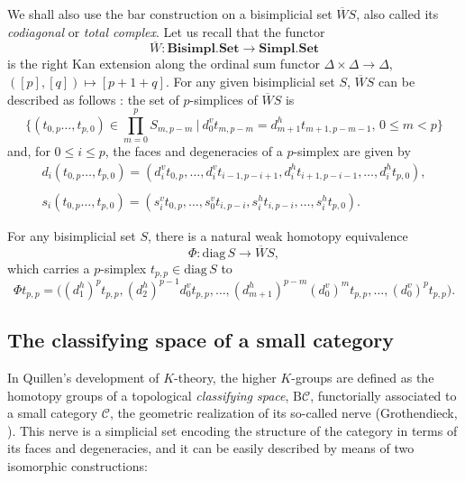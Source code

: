 \documentclass[]{amsart}
\begin{document}
We shall also use the bar construction on a bisimplicial set $\overline{W}S$, also called its {\em
codiagonal} or {\em total complex}. Let us recall that the functor
$$
\overline{W}: {\ensuremath{\mathbf{Bisimpl.Set}}} \to {\ensuremath{\mathbf{Simpl.Set}}}
$$
is  the right Kan extension along the ordinal sum functor ${\ensuremath{\Delta}}\times {\ensuremath{\Delta}} \to{\ensuremath{\Delta}}$,
$([p],[q])\mapsto [p+1+q]$. For any given bisimplicial set $S$, $\overline{W}S$ can be described as
follows \cite[\S III]{artin-mazur}: the set of $p$-simplices of $\overline{W}S$ is
$$
\Big\{(t_{0,p} \dots,t_{p,0})\in
\prod_{m=0}^{p}S_{m,p-m}~|~d^v_0t_{m,p-m}=d^h_{m+1}t_{m+1,p-m-1},\, 0\leq m< p\Big\}$$ and, for
$0\leq i\leq p$, the faces and degeneracies of a $p$-simplex are given by
$$
\begin{array}{l}d_i(t_{0,p}
\dots,t_{p,0})=(d_i^vt_{0,p},\dots,d_i^vt_{i-1,p-i+1},d_i^ht_{i+1,p-i-1},\dots,d_i^ht_{p,0}),
\\[-4pt]~\\
s_i(t_{0,p} \dots,t_{p,0})=(s_i^vt_{0,p},\dots,s_0^vt_{i,p-i},s_i^ht_{i,p-i},\dots,s_i^ht_{p,0}).
\end{array}
$$

For any bisimplicial set $S$, there is a natural weak homotopy equivalence \cite{cegarra1,cegarra2}
\begin{equation}\label{Phi} \Phi:{\ensuremath{\mathrm{diag}}}\,S\to \overline{W}S,
\end{equation}
which carries a $p$-simplex $t_{p,p}\in {\ensuremath{\mathrm{diag}}} \,S$ to
$$
\Phi t_{p,p}=\Big((d_1^h)^pt_{p,p},(d_2^h)^{p-1}d_0^vt_{p,p},\dots,
(d_{m+1}^h)^{p-m}(d_0^v)^mt_{p,p},\dots, (d_0^v)^pt_{p,p}\Big).
$$

\subsection{The classifying space of a small category}
In Quillen's development of $K$-theory, the higher $K$-groups are defined as the homotopy groups of
a topological {\em classifying space}, ${\ensuremath{\mathrm{B}}} {\ensuremath{\mathcal{C}}}$, functorially associated to a small category
${\ensuremath{\mathcal{C}}}$, the geometric realization of its so-called nerve (Grothendieck, \cite{grothendieck}). This
nerve is a simplicial set encoding the structure of the category in terms of its faces and
degeneracies, and it can be easily described by means of two isomorphic constructions:
\end{document}
